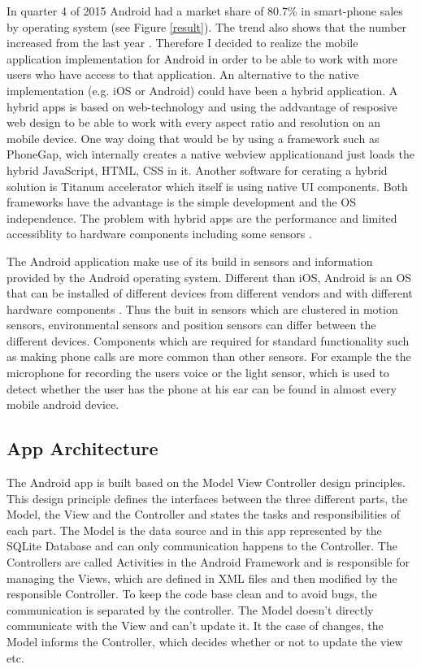 \begin{flushleft}
In quarter 4 of 2015 Android had a market share of 80.7\% in smart-phone sales by operating system (see Figure \ref{result}). The trend also shows that the number increased from the last year \cite{gartnerMobileOSMarketshare}. Therefore I decided to realize the mobile application implementation for Android in order to be able to work with more users who have access to that application.
An alternative to the native implementation (e.g. iOS or Android) could have been a hybrid application. A hybrid apps is based on web-technology and using the addvantage of resposive web design to be able to work with every aspect ratio and resolution on an mobile device. One way doing that would be by using a framework such as PhoneGap, wich internally creates a native webview applicationand just loads the hybrid JavaScript, HTML, CSS in it. Another software for cerating a hybrid solution is Titanum accelerator which itself is using native UI components. Both frameworks have the advantage is the simple development and the OS independence. The problem with hybrid apps are the performance and limited accessiblity to hardware components including some sensors \cite{holzinger2012making}.  

The Android application make use of its build in sensors and information provided by the Android operating system. Different than iOS, Android is an OS that can be installed of different devices from different vendors and with different hardware components \cite{goadrich2011smart}. Thus the buit in sensors which are clustered in motion sensors, environmental sensors and position sensors \cite{androidDevelopers} can differ between the different devices. Components which are required for standard functionality such as making phone calls are more common than other sensors. For example the the microphone for recording the users voice or the light sensor, which is used to detect whether the user has the phone at his ear can be found in almost every mobile android device. 

\subsection{App Architecture}
The Android app is built based on the Model View Controller design principles. This design principle defines the interfaces between the three different parts, the Model, the View and the Controller and states the tasks and responsibilities of each part. 
The Model is the data source and in this app represented by the SQLite Database and can only communication happens to the Controller. 
The Controllers are called Activities in the Android Framework and is responsible for managing the Views, which are defined in XML files and then modified by the responsible Controller. 
To keep the code base clean and to avoid bugs, the communication is separated by the controller. The Model doesn't directly communicate with the View and can't update it. It the case of changes, the Model informs the Controller, which decides whether or not to update the view etc. 


\end{flushleft}
